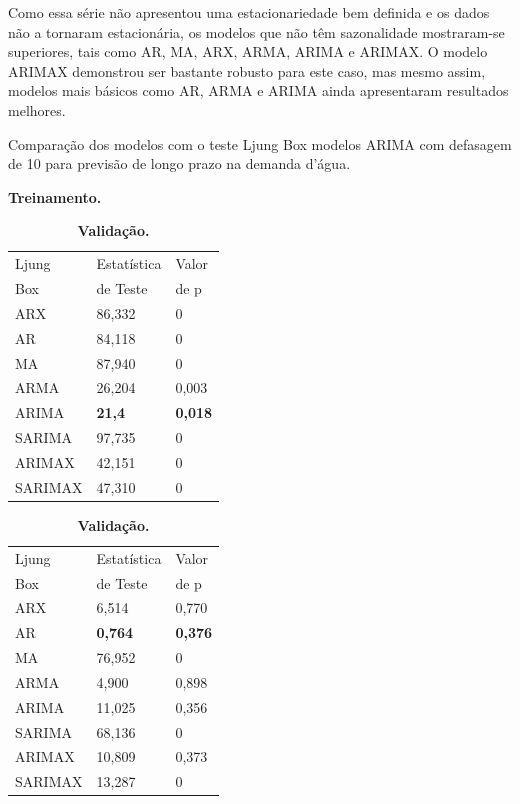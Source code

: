 Como essa série não apresentou uma estacionariedade bem definida e os dados não a tornaram estacionária, os modelos que não têm sazonalidade mostraram-se superiores, tais como AR, MA, ARX, ARMA, ARIMA e ARIMAX. O modelo ARIMAX demonstrou ser bastante robusto para este caso, mas mesmo assim, modelos mais básicos como AR, ARMA e ARIMA ainda apresentaram resultados melhores.

\begin{table}[H]
	\centering		
	\caption{Comparação dos modelos com o teste Ljung Box modelos ARIMA com defasagem de 10 para previsão de longo prazo na demanda d'água.}
	
	\begin{subtable}{0.49\linewidth}
		\centering
		\caption{\textbf{Treinamento.}} \label{tb:lbtrn}
		\begin{tabular}{@{}lll@{}}
			\toprule
			Ljung  & Estatística  & Valor \\
			Box & de Teste& de p\\\midrule
			ARX & 86,332 & 0           \\
			AR  & 84,118 & 0            \\
			MA  & 87,940 & 0             \\
			ARMA & 26,204 & 0,003         \\
			ARIMA & \textbf{21,4} &\textbf{0,018}  \\
			SARIMA & 97,735 & 0 \\
			ARIMAX & 42,151 & 0   \\
			SARIMAX  & 47,310 & 0                    \\ \bottomrule
		\end{tabular}
	\end{subtable}
	\hfill
	\begin{subtable}{0.49\linewidth}
		\centering
		\caption{\textbf{Validação.}} \label{tb:lbvld}
		\begin{tabular}{@{}lll@{}}
			\toprule
			Ljung  & Estatística  & Valor \\
			Box & de Teste& de p\\\midrule
			ARX       & 6,514                         & 0,770               \\
			AR        & \textbf{0,764}              & \textbf{0,376}     \\
			MA        & 76,952                        & 0                   \\
			ARMA      & 4,900                         & 0,898               \\
			ARIMA     & 11,025                        & 0,356               \\
			SARIMA    & 68,136                        & 0                   \\
			ARIMAX    & 10,809                        & 0,373               \\
			SARIMAX   & 13,287                        & 0                   \\ \bottomrule
		\end{tabular}
	\end{subtable}
			

\end{table}
